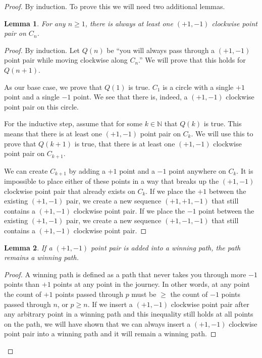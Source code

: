 \documentclass[10pt,letter]{article}
\newtheorem{lem}{Lemma}
\begin{document}
\begin{proof}
By induction. To prove this we will need two additional lemmas.
\begin{lem} \label{lemma:circle1}
For any $n \ge 1$, there is always at least one $(+1, -1)$ clockwise point pair on $C_n$.
\end{lem}
\begin{proof}
By induction. Let $Q(n)$ be ``you will always pass through a $(+1, -1)$ point pair while moving clockwise along $C_n$.'' We will prove that this holds for $Q(n+1)$.

As our base case, we prove that $Q(1)$ is true. $C_1$ is a circle with a single $+1$ point and a single $-1$ point. We see that there is, indeed, a $(+1, -1)$ clockwise point pair on this circle.

For the inductive step, assume that for some $k \in \mathbb{N}$ that $Q(k)$ is true. This means that there is at least one $(+1, -1)$ point pair on $C_k$. We will use this to prove that $Q(k+1)$ is true, that there is at least one $(+1, -1)$ clockwise point pair on $C_{k+1}$. 

We can create $C_{k+1}$ by adding a $+1$ point and a $-1$ point anywhere on $C_k$. It is impossible to place either of these points in a way that breaks up the $(+1, -1)$ clockwise point pair that already exists on $C_k$. If we place the $+1$ between the existing $(+1, -1)$ pair, we create a new sequence $(+1, +1, -1)$ that still contains a $(+1, -1)$ clockwise point pair. If we place the $-1$ point between the existing $(+1, -1)$ pair, we create a new sequence $(+1, -1, -1)$ that still contains a $(+1, -1)$ clockwise point pair.
\end{proof}

\begin{lem} \label{lemma:circle2}
If a $(+1, -1)$ point pair is added into a winning path, the path remains a winning path.
\end{lem}

\begin{proof}
A winning path is defined as a path that never takes you through more $-1$ points than $+1$ points at any point in the journey. In other words, at any point the count of $+1$ points passed through $p$ must be $\ge$ the count of $-1$ points passed through $n$, or $p \ge n$. If we insert a $(+1, -1)$ clockwise point pair after any arbitrary point in a winning path and this inequality still holds at all points on the path, we will have shown that we can always insert a $(+1, -1)$ clockwise point pair into a winning path and it will remain a winning path. 


\end{proof}
\end{proof}
\end{document}

